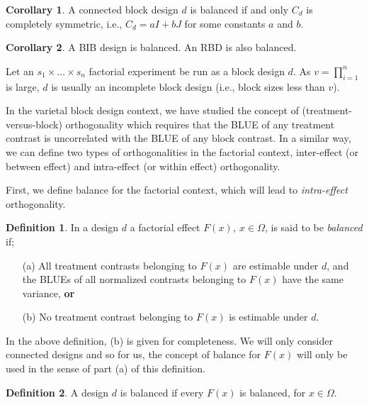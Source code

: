 \documentclass[12pt]{article}
\theoremstyle{definition}
\newtheorem{cor}{Corollary}
\newtheorem{defn}{Definition}
\newenvironment{definition}{
\begin{tcolorbox}[colback=green!5!white,colframe=green!75!black, parbox = false]\begin{defn} }{\end{defn}\end{tcolorbox} }
\newenvironment{note}{
\begin{tcolorbox}[colback=blue!5!white,colframe=blue!75!black,title=Note, parbox = false] }{\end{tcolorbox} }
\newenvironment{corollary}{
\begin{tcolorbox}[colback=blue!5!white,colframe=blue!75!black, parbox = false]\begin{cor} }{\end{cor}\end{tcolorbox} }
\begin{document}
\begin{corollary}
    A connected block design $d$ is balanced if and only $C_d$ is completely symmetric, i.e., $C_d = aI + bJ$ for some constants $a$ and $b$.
\end{corollary}

\begin{corollary}
    A BIB design is balanced. An RBD is also balanced.
\end{corollary}

Let an $s_1\times \ldots \times s_n$ factorial experiment be run as a block design $d$.  As $v=\prod_{i=1}^n$ is large, $d$ is usually an incomplete block design (i.e., block sizes less than $v$).

In the varietal block design context, we have studied the concept of (treatment-versus-block) orthogonality which requires that the BLUE of any treatment contrast is uncorrelated with the BLUE of any block contrast. In a similar way, we can define two types of orthogonalities in the factorial context, inter-effect (or between effect) and intra-effect (or within effect) orthogonality. 

First, we  define balance for the factorial context, which will lead to \textit{intra-effect} orthogonality.

\begin{definition}
    In a design $d$ a factorial effect $F(x), \ x\in \Omega$, is said to be \textit{balanced} if;
    \begin{enumerate}
        \item[(a)] All treatment contrasts belonging to $F(x)$ are estimable under $d$, and the BLUEs of all normalized contrasts belonging to $F(x)$ have the same variance, \textbf{or}
        \item[(b)] No treatment contrast belonging to $F(x)$ is estimable under $d$.
    \end{enumerate}
\end{definition}

\begin{note}
    In the above definition, (b) is given for completeness. We will only consider connected designs and so for us, the concept of balance for $F(x)$ will only be used in the sense of part (a) of this definition.
\end{note}

\begin{definition}
    A design $d$ is balanced if every $F(x)$ is balanced, for $x \in \Omega$. 
\end{definition}
\end{document}
